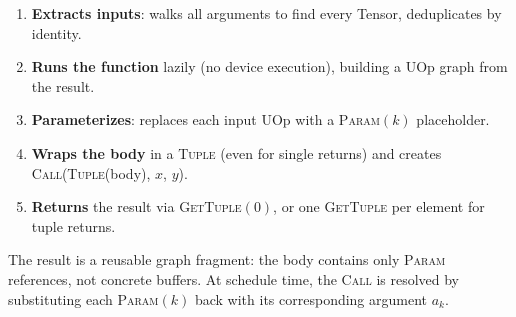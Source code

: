 \documentclass[10pt,letterpaper]{article}
\newcommand{\op}[1]{\textsc{#1}}
\begin{document}
\begin{enumerate}[leftmargin=1.5em, itemsep=2pt]
  \item \textbf{Extracts inputs}: walks all arguments to find every Tensor, deduplicates by identity.
  \item \textbf{Runs the function} lazily (no device execution), building a UOp graph from the result.
  \item \textbf{Parameterizes}: replaces each input UOp with a \op{Param}$(k)$ placeholder.
  \item \textbf{Wraps the body} in a \op{Tuple} (even for single returns) and creates\\
        \op{Call}(\op{Tuple}(body), $x$, $y$).
  \item \textbf{Returns} the result via \op{GetTuple}$(0)$, or one \op{GetTuple} per element for tuple returns.
\end{enumerate}

The result is a reusable graph fragment: the body contains only \op{Param} references, not concrete buffers. At schedule time, the \op{Call} is resolved by substituting each \op{Param}$(k)$ back with its corresponding argument $a_k$.
\end{document}
